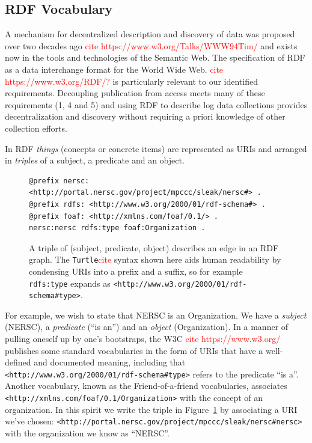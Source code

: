 \subsection{RDF Vocabulary}

A mechanism for decentralized description and discovery of data was proposed
over two decades ago \textcolor{red}{cite https://www.w3.org/Talks/WWW94Tim/} 
and exists now in the tools and technologies of the Semantic Web. The 
specification of RDF as a data interchange format for the World Wide 
Web. \textcolor{red}{cite https://www.w3.org/RDF/?} is particularly relevant 
to our identified requirements. Decoupling publication 
from access meets many of these requirements (1, 4 and 5) and 
using RDF to describe log data collections provides decentralization 
and discovery without requiring a priori knowledge of other collection 
efforts.

In RDF \emph{things} (concepts or concrete items) are represented as URIs
and arranged in \emph{triples} of a subject, a predicate and an object.  

\begin{figure}
\begin{verbatim}
@prefix nersc: <http://portal.nersc.gov/project/mpccc/sleak/nersc#> .
@prefix rdfs: <http://www.w3.org/2000/01/rdf-schema#> .
@prefix foaf: <http://xmlns.com/foaf/0.1/> .
nersc:nersc rdfs:type foaf:Organization .
\end{verbatim}

\caption{A triple of (subject, predicate, object) describes an edge 
in an RDF graph. The \texttt{Turtle}\textcolor{red}{cite} syntax shown
here aids human readability by condensing URIs into a prefix and a suffix,
so for example \texttt{rdfs:type} expands as
\texttt{<http://www.w3.org/2000/01/rdf-schema\#type>}.}
\label{f:rdftriples}
\end{figure}

For example, we wish to state that NERSC is an Organization. We have a 
\emph{subject} (NERSC), a \emph{predicate} (``is an'') and an \emph{object} 
(Organization). In a manner of pulling oneself up by one's bootstraps, the 
W3C \textcolor{red}{cite https://www.w3.org/} publishes some standard 
vocabularies in the form of URIs that have a well-defined and documented 
meaning, including that \texttt{<http://www.w3.org/2000/01/rdf-schema\#type>}
refers to the predicate ``is a''. Another vocabulary, known as the 
Friend-of-a-friend vocabularies, associates \texttt{<http://xmlns.com/foaf/0.1/Organization>} with the concept of an 
organization. In this spirit we write the triple in Figure~\ref{f:rdftriples}
by associating a URI we've chosen: \texttt{<http://portal.nersc.gov/project/mpccc/sleak/nersc\#nersc>} with the 
organization we know as ``NERSC''. 

